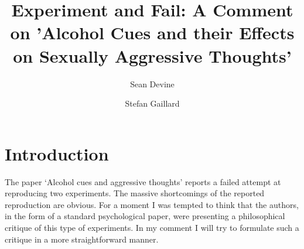 \documentclass[twocolumn, serif, review, authordate]{jote-article}
\title{Experiment and Fail: A Comment on 'Alcohol Cues and their Effects on Sexually Aggressive Thoughts'}
\author[1]{Sean Devine}
\author[2]{Stefan Gaillard}
\affil[1]{Reviewer 1}
\affil[2]{Reviewer 2}
\begin{document}
\begin{frontmatter}

\maketitle



\end{frontmatter}

{}
\section*{Introduction}

The paper `Alcohol cues and aggressive thoughts' reports a failed attempt at reproducing two experiments. The massive shortcomings of the reported reproduction are obvious. For a moment I was tempted to think that the authors, in the form of a standard psychological paper, were presenting a philosophical critique of this type of experiments. In my comment I will try to formulate such a critique in a more straightforward manner.
\end{document}
